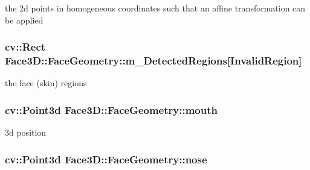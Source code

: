 the 2d points in homogeneous coordinates such that an affine transformation can be applied 

\subsubsection[{\texorpdfstring{m\+\_\+\+Detected\+Regions}{m_DetectedRegions}}]{\setlength{\rightskip}{0pt plus 5cm}cv\+::\+Rect Face3\+D\+::\+Face\+Geometry\+::m\+\_\+\+Detected\+Regions\mbox{[}{\bf Invalid\+Region}\mbox{]}\hspace{0.3cm}{\ttfamily [private]}}\hypertarget{class_face3_d_1_1_face_geometry_a41bdb9ec230523b1bc19bc8f7f2b48ea}{}\label{class_face3_d_1_1_face_geometry_a41bdb9ec230523b1bc19bc8f7f2b48ea}


the face (skin) regions 

\subsubsection[{\texorpdfstring{mouth}{mouth}}]{\setlength{\rightskip}{0pt plus 5cm}cv\+::\+Point3d Face3\+D\+::\+Face\+Geometry\+::mouth\hspace{0.3cm}{\ttfamily [private]}}\hypertarget{class_face3_d_1_1_face_geometry_a1c36fe81650a276b523d8dc17b30038e}{}\label{class_face3_d_1_1_face_geometry_a1c36fe81650a276b523d8dc17b30038e}


3d position 

\subsubsection[{\texorpdfstring{nose}{nose}}]{\setlength{\rightskip}{0pt plus 5cm}cv\+::\+Point3d Face3\+D\+::\+Face\+Geometry\+::nose\hspace{0.3cm}{\ttfamily [private]}}\hypertarget{class_face3_d_1_1_face_geometry_a51b5cf29a6deac13aad7ab3ba3858eca}{}\label{class_face3_d_1_1_face_geometry_a51b5cf29a6deac13aad7ab3ba3858eca}

